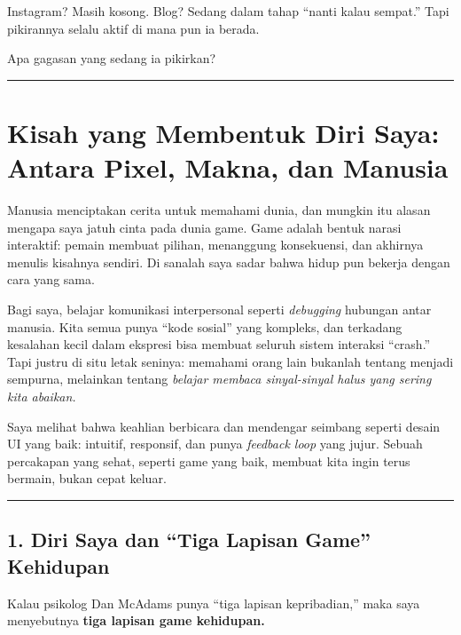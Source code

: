 \documentclass[
  letterpaper,
  DIV=11,
  numbers=noendperiod]{scrreprt}
\begin{document}
Instagram? Masih kosong. Blog? Sedang dalam tahap ``nanti kalau
sempat.'' Tapi pikirannya selalu aktif di mana pun ia berada.

Apa gagasan yang sedang ia pikirkan?

\begin{center}\rule{0.5\linewidth}{0.5pt}\end{center}

\section{\texorpdfstring{\textbf{Kisah yang Membentuk Diri Saya: Antara
Pixel, Makna, dan
Manusia}}{Kisah yang Membentuk Diri Saya: Antara Pixel, Makna, dan Manusia}}\label{kisah-yang-membentuk-diri-saya-antara-pixel-makna-dan-manusia}

Manusia menciptakan cerita untuk memahami dunia, dan mungkin itu alasan
mengapa saya jatuh cinta pada dunia game. Game adalah bentuk narasi
interaktif: pemain membuat pilihan, menanggung konsekuensi, dan akhirnya
menulis kisahnya sendiri. Di sanalah saya sadar bahwa hidup pun bekerja
dengan cara yang sama.

Bagi saya, belajar komunikasi interpersonal seperti \emph{debugging}
hubungan antar manusia. Kita semua punya ``kode sosial'' yang kompleks,
dan terkadang kesalahan kecil dalam ekspresi bisa membuat seluruh sistem
interaksi ``crash.'' Tapi justru di situ letak seninya: memahami orang
lain bukanlah tentang menjadi sempurna, melainkan tentang \emph{belajar
membaca sinyal-sinyal halus yang sering kita abaikan.}

Saya melihat bahwa keahlian berbicara dan mendengar seimbang seperti
desain UI yang baik: intuitif, responsif, dan punya \emph{feedback loop}
yang jujur. Sebuah percakapan yang sehat, seperti game yang baik,
membuat kita ingin terus bermain, bukan cepat keluar.

\begin{center}\rule{0.5\linewidth}{0.5pt}\end{center}

\subsection{\texorpdfstring{\textbf{1. Diri Saya dan ``Tiga Lapisan
Game''
Kehidupan}}{1. Diri Saya dan ``Tiga Lapisan Game'' Kehidupan}}\label{diri-saya-dan-tiga-lapisan-game-kehidupan}

Kalau psikolog Dan McAdams punya ``tiga lapisan kepribadian,'' maka saya
menyebutnya \textbf{tiga lapisan game kehidupan.}
\end{document}
